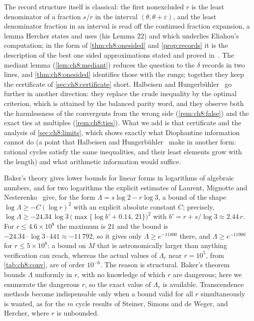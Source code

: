 \begin{remark}[Attribution]
The record structure itself is classical: the first
nonexcluded $r$ is the least denominator of a fraction $s/r$ in the interval
$(\theta,\theta+\varepsilon)$, and the least denominator fraction in an interval
is read off the continued fraction expansion, a lemma Hercher states and uses
(his Lemma 22) and which underlies Eliahou's computation; in the form of \cref{thm:ch8:onesided} and \cref{prop:records} it is the description of the best one sided approximations stated and proved in~\cite[Theorem~4.5(ii)]{hancl2019}. The mediant lemma
(\cref{lem:ch8:mediant}) reduces the question to the $\delta$ records in two lines, and \cref{thm:ch8:onesided} identifies those with the rungs;
together they keep the certificate of \cref{sec:ch8:certificate} short. Halbeisen and Hungerb\"uhler~\cite{halbeisen1997} go further in another direction: they replace the crude inequality by the optimal criterion, which is attained by the balanced parity word, and they observe both the harmlessness of the convergents from the wrong side (\cref{rem:ch8:false}) and the exact ties at multiples (\cref{rem:ch8:ties}). What we add
is that certificate and the analysis of \cref{sec:ch8:limits}, which shows exactly what Diophantine
information cannot do (a point that Halbeisen and Hungerb\"uhler~\cite[\S5]{halbeisen1997} make in another form: rational cycles satisfy the same inequalities, and their least elements grow with the length) and what arithmetic information would suffice.
\end{remark}

\begin{remark}\label{rem:ch8:baker}
Baker's theory gives lower bounds for linear forms in logarithms of algebraic
numbers, and for two logarithms the explicit estimates of Laurent, Mignotte
and Nesterenko~\cite[Corollary~2]{laurent1995} give, for the form
$\Lambda=s\log2-r\log3$, a bound of the shape $\log\Lambda\geq-C(\log r)^2$
with an explicit absolute constant $C$; precisely, $\log\Lambda\geq-24.34\,\log3\,\bigl(\max\{\log b'+0.14,\,21\}\bigr)^2$ with $b'=r+s/\log3\approx2.44\,r$.
For $r\leq4.6\times10^8$ the maximum is $21$ and the bound is $-24.34\cdot\log3\cdot441\approx-11\,792$, so it gives only $\Lambda\geq e^{-11800}$ there, and $\Lambda\geq e^{-11900}$ for $r\leq5\times10^8$: a bound on
$M$ that is astronomically larger than anything verification can reach,
whereas the actual values of $\Lambda_r$ near $r=10^5$, from
\cref{tab:ch8:conv}, are of order $10^{-6}$. The reason is structural. Baker's
theorem bounds $\Lambda$ uniformly in $r$, with no knowledge of which $r$ are
dangerous; here we enumerate the dangerous $r$, so the exact value of
$\Lambda_r$ is available. Transcendence methods become indispensable only
when a bound valid for all $r$ simultaneously is wanted, as for the $m$ cycle
results of Steiner, Simons and de Weger, and Hercher, where $r$ is unbounded.
\end{remark}

